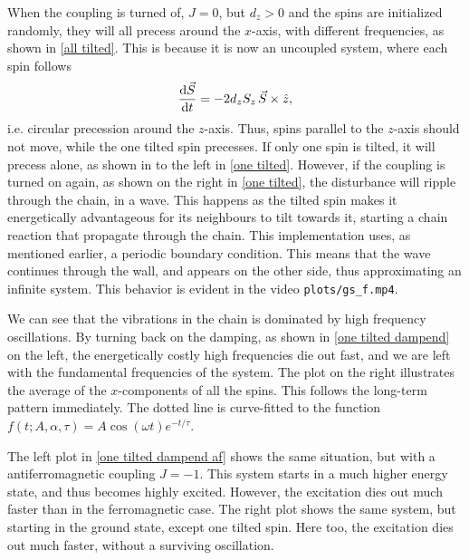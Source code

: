 \documentclass{article}
\begin{document}
    When the coupling is turned of, $J = 0$, but $d_z>0$ and the spins are initialized randomly, they will all precess around the $x$-axis, with different frequencies, as shown in \autoref{all tilted}.
    This is because it is now an uncoupled system, where each spin follows 
    \begin{equation*}
        \dv{\vec S}{t} = - 2 d_z S_z \,\vec S \times \hat z, 
    \end{equation*}
    i.e.
    circular precession around the $z$-axis.
    Thus, spins parallel to the $z$-axis should not move, while the one tilted spin precesses.
    If only one spin is tilted, it will precess alone, as shown in to the left in \autoref{one tilted}.
    However, if the coupling is turned on again, as shown on the right in \autoref{one tilted}, the disturbance will ripple through the chain, in a wave.
    This happens as the tilted spin makes it energetically advantageous for its neighbours to tilt towards it, starting a chain reaction that propagate through the chain. This implementation uses, as mentioned earlier, a periodic boundary condition. This means that the wave continues through the wall, and appears on the other side, thus approximating an infinite system. This behavior is evident in the video \verb|plots/gs_f.mp4|. 

    We can see that the vibrations in the chain is dominated by high frequency oscillations.
    By turning back on the damping, as shown in \autoref{one tilted dampend} on the left, the energetically costly high frequencies die out fast, and we are left with the fundamental frequencies of the system.
    The plot on the right illustrates the average of the $x$-components of all the spins.
    This follows the long-term pattern immediately.
    The dotted line is curve-fitted to the function $f(t; A, \alpha, \tau) = A \cos(\omega t) e^{-t/\tau}$.

    The left plot in \autoref{one tilted dampend af} shows the same situation, but with a antiferromagnetic coupling $J = -1$.
    This system starts in a much higher energy state, and thus becomes highly excited.
    However, the excitation dies out much faster than in the ferromagnetic case.
    The right plot shows the same system, but starting in the ground state, except one tilted spin.
    Here too, the excitation dies out much faster, without a surviving oscillation.
\end{document}
